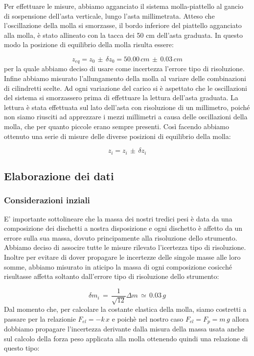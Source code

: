 Per effettuare le misure, abbiamo agganciato il sistema molla-piattello al gancio di sospensione dell'asta verticale, lungo l'asta millimetrata. Atteso che l'oscillazione della molla si smorzasse, il bordo inferiore del piattello agganciato alla molla, è stato allineato con la tacca dei 50 cm dell'asta graduata. In questo modo la posizione di equilibrio della molla risulta essere:

\begin{equation*}
	z_{eq} = z_0\,\pm\,\delta z_0 = 50.00\,cm\,\pm\,0.03\,cm
\end{equation*}
%
per la quale abbiamo deciso di usare come incertezza l'errore tipo di risoluzione.
Infine abbiamo misurato l'allungamento della molla al variare delle combinazioni di cilindretti scelte. Ad ogni variazione del carico si è aspettato che le oscillazioni del sistema si smorzassero prima di effettuare la lettura dell'asta graduata. La lettura è stata effettuata sul lato dell'asta con risoluzione di un millimetro, poiché non siamo riusciti ad apprezzare i mezzi millimetri a causa delle oscillazioni della molla, che per quanto piccole erano sempre presenti. Così facendo abbiamo ottenuto una serie di misure delle diverse posizioni di equilibrio della molla:

\begin{equation*}
	z_i = z_i\,\pm\,\delta z_i 
\end{equation*}

\subsection{Elaborazione dei dati}

\subsubsection{Considerazioni inziali}

E' importante sottolineare che la massa dei nostri tredici pesi è data da una composizione dei dischetti a nostra disposizione e ogni dischetto è affetto da un errore sulla sua massa, dovuto principamente alla risoluzione dello strumento. Abbiamo deciso di associre tutte le misure rilevato l'icertezza tipo di risoluzione.
Inoltre per evitare di dover propagare le incertezze delle singole masse alle loro somme, abbiamo misurato in aticipo la massa di ogni composizione cosicché risultasse affetta soltanto dall'errore tipo di risoluzione dello strumento:

\begin{equation*}
	\delta m_i \,=\, \frac{1}{\sqrt{12}}\Delta m \,\simeq\, 0.03 \,g 
\end{equation*}
%
Dal momento che, per calcolare la costante elastica della molla, siamo costretti a passare per la relazionie $F_{el} = -k\,x$ e poichè nel nostro caso $F_{el} = F_{p} = m\,g$ allora dobbiamo propagare l'incertezza derivante dalla misura della massa usata anche sul calcolo della forza peso applicata alla molla ottenendo quindi una relazione di questo tipo:

